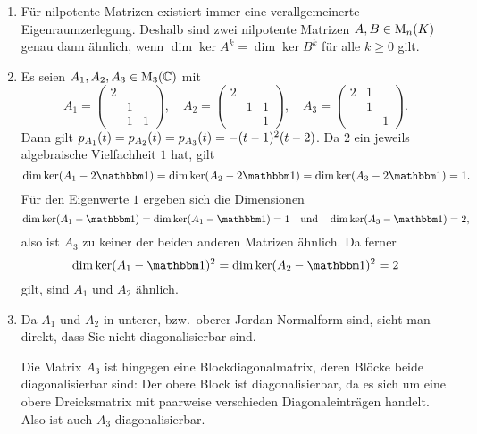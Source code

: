 \begin{example}
  \leavevmode
  \begin{enumerate}
    \item
      Für nilpotente Matrizen existiert immer eine verallgemeinerte Eigenraumzerlegung.
      Deshalb sind zwei nilpotente Matrizen $A, B \in \operatorname{M}_{n}(K)$ genau dann ähnlich, wenn $\dim \ker A^k = \dim \ker B^k$ für alle $k \geq 0$ gilt.
    \item
      Es seien $A_1, A_2, A_3 \in \operatorname{M}_{3}(\mathbb{C})$ mit
      \[
          A_1
        = \begin{pmatrix}
            2 &   &   \\
              & 1 &   \\
              & 1 & 1
          \end{pmatrix},
        \quad
          A_2
        = \begin{pmatrix}
            2 &   &   \\
              & 1 & 1 \\
              &   & 1
          \end{pmatrix},
        \quad
          A_3
        = \begin{pmatrix}
            2 & 1 &   \\
              & 1 &   \\
              &   & 1
          \end{pmatrix}.
      \]
      Dann gilt $p_{A_1}(t) = p_{A_2}(t) = p_{A_3}(t) = - (t-1)^2 (t-2)$.
      Da $2$ ein jeweils algebraische Vielfachheit $1$ hat, gilt
      \[
          \dim \ker (A_1 - 2 \Id)
        = \dim \ker (A_2 - 2 \Id)
        = \dim \ker (A_3 - 2 \Id)
        = 1.
      \]
      Für den Eigenwerte $1$ ergeben sich die Dimensionen
      \[
          \dim \ker (A_1 - \Id)
        = \dim \ker (A_1 - \Id)
        = 1
        \quad\text{und}\quad
          \dim \ker (A_3 - \Id)
       = 2,
      \]
      also ist $A_3$ zu keiner der beiden anderen Matrizen ähnlich.
      Da ferner
      \[
          \dim \ker (A_1 - \Id)^2
        = \dim \ker (A_2 - \Id)^2
        = 2
      \]
      gilt, sind $A_1$ und $A_2$ ähnlich.
      
    \item
      Da $A_1$ und $A_2$ in unterer, bzw.\ oberer Jordan-Normalform sind, sieht man direkt, dass Sie nicht diagonalisierbar sind.
      
      Die Matrix $A_3$ ist hingegen eine Blockdiagonalmatrix, deren Blöcke beide diagonalisierbar sind:
      Der obere Block ist diagonalisierbar, da es sich um eine obere Dreicksmatrix mit paarweise verschieden Diagonaleinträgen handelt.
      Also ist auch $A_3$ diagonalisierbar.
      

\end{enumerate}
\end{example}
